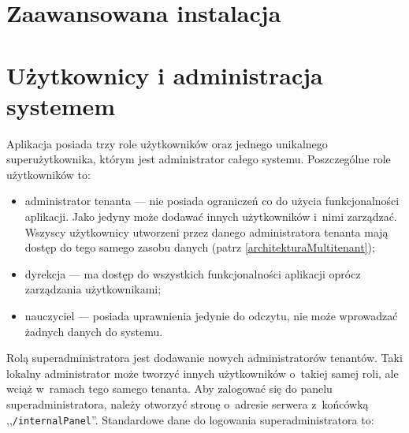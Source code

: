 \documentclass[a4paper]{book}
\begin{document}
\section{Zaawansowana instalacja}

\section{Użytkownicy i administracja systemem}
Aplikacja posiada trzy role użytkowników oraz jednego unikalnego superużytkownika, którym jest administrator całego systemu. Poszczególne role użytkowników to:
\begin{itemize}
	\item administrator tenanta --- nie posiada ograniczeń co do użycia funkcjonalności aplikacji. Jako jedyny może dodawać innych użytkowników i~nimi zarządzać. Wszyscy użytkownicy utworzeni przez danego administratora tenanta mają dostęp do tego samego zasobu danych (patrz \ref{architekturaMultitenant});
	\item dyrekcja --- ma dostęp do wszystkich funkcjonalności aplikacji oprócz zarządzania użytkownikami;
	\item nauczyciel --- posiada uprawnienia jedynie do odczytu, nie może wprowadzać żadnych danych do systemu.
\end{itemize}
Rolą superadministratora jest dodawanie nowych administratorów tenantów. Taki lokalny administrator może tworzyć innych użytkowników o~takiej samej roli, ale wciąż w~ramach tego samego tenanta. Aby zalogować się do panelu superadministratora, należy otworzyć stronę o~adresie serwera z~końcówką ,,\lstinline|/internalPanel|''. Standardowe dane do logowania superadministratora to:
\end{document}
